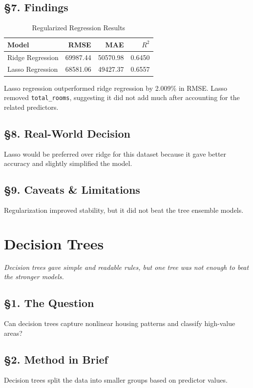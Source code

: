 \documentclass[12pt]{report}
\begin{document}
\section*{\S7. Findings}

\begin{table}[H]
\centering
\caption{Regularized Regression Results}
\begin{tabular}{lrrr}
\toprule
Model & RMSE & MAE & $R^2$ \\
\midrule
Ridge Regression & 69987.44 & 50570.98 & 0.6450 \\
Lasso Regression & 68581.06 & 49427.37 & 0.6557 \\
\bottomrule
\end{tabular}
\end{table}

Lasso regression outperformed ridge regression by 2.009\% in RMSE. Lasso removed \texttt{total\_rooms}, suggesting it did not add much after accounting for the related predictors.

\section*{\S8. Real-World Decision}
Lasso would be preferred over ridge for this dataset because it gave better accuracy and slightly simplified the model.

\section*{\S9. Caveats \& Limitations}
Regularization improved stability, but it did not beat the tree ensemble models.

\newpage

\chapter{Decision Trees}

\begin{center}
\textit{Decision trees gave simple and readable rules, but one tree was not enough to beat the stronger models.}
\end{center}

\section*{\S1. The Question}
Can decision trees capture nonlinear housing patterns and classify high-value areas?

\section*{\S2. Method in Brief}
Decision trees split the data into smaller groups based on predictor values.
\end{document}

